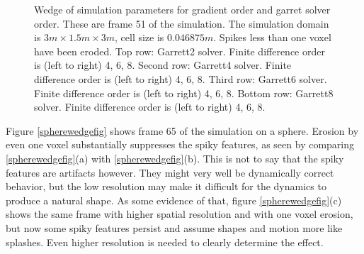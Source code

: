 \documentclass{article}
\begin{document}
\begin{figure}
\begin{center}
\begin{tabular}{cccl}
\end{tabular}
\end{center}
\caption{ Wedge of simulation parameters for gradient order and garret solver order. These are frame 51 of the simulation. The simulation domain is $3 m \times 1.5 m \times 3m$, cell size is $0.046875 m$. Spikes less than one voxel have been eroded. Top row: Garrett2 solver. Finite difference order is (left to right) 4, 6, 8.  Second row: Garrett4 solver. Finite difference order is (left to right) 4, 6, 8.  Third row: Garrett6 solver. Finite difference order is (left to right) 4, 6, 8.  Bottom row: Garrett8 solver. Finite difference order is (left to right) 4, 6, 8.    } \label{wedge1fig}
\end{figure}


Figure \ref{spherewedgefig} shows frame 65 of the simulation on a sphere.  Erosion by even one voxel substantially suppresses the spiky features, as seen by comparing \ref{spherewedgefig}(a) with \ref{spherewedgefig}(b).  This is not to say that the spiky features are artifacts however.  They might very well be dynamically correct behavior, but the low resolution may make it difficult for the dynamics to produce a natural shape. As some evidence of that, figure \ref{spherewedgefig}(c) shows the same frame with higher spatial resolution and with one voxel erosion, but now some spiky features persist and assume shapes and motion more like splashes.  Even higher resolution is needed to clearly determine the effect.  
\end{document}
